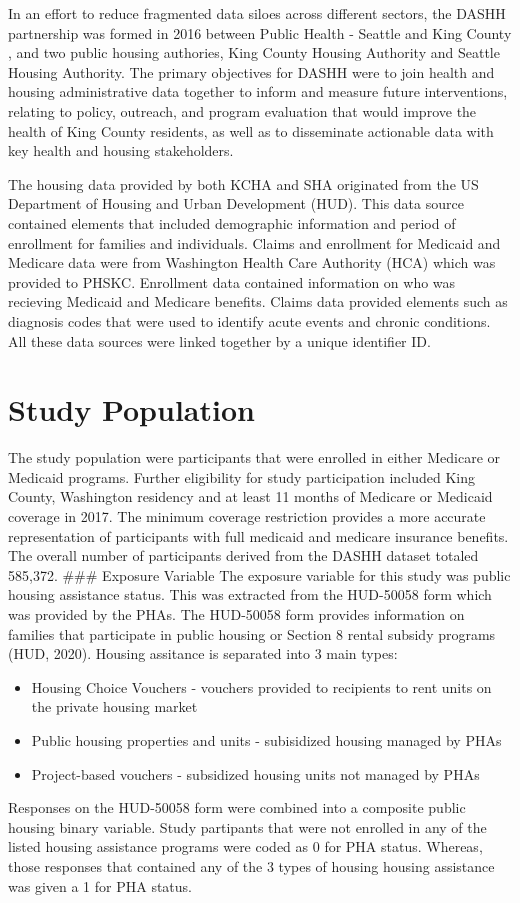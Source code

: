 \documentclass [11pt, proquest] {uwthesis}[2015/03/03]
\providecommand{\tightlist}{%
  \setlength{\itemsep}{0pt}\setlength{\parskip}{0pt}}
\begin{document}
In an effort to reduce fragmented data siloes across different sectors,
the DASHH partnership was formed in 2016 between Public Health - Seattle
and King County , and two public housing authories, King County Housing
Authority and Seattle Housing Authority. The primary objectives for
DASHH were to join health and housing administrative data together to
inform and measure future interventions, relating to policy, outreach,
and program evaluation that would improve the health of King County
residents, as well as to disseminate actionable data with key health and
housing stakeholders.

The housing data provided by both KCHA and SHA originated from the US
Department of Housing and Urban Development (HUD). This data source
contained elements that included demographic information and period of
enrollment for families and individuals. Claims and enrollment for
Medicaid and Medicare data were from Washington Health Care Authority
(HCA) which was provided to PHSKC. Enrollment data contained information
on who was recieving Medicaid and Medicare benefits. Claims data
provided elements such as diagnosis codes that were used to identify
acute events and chronic conditions. All these data sources were linked
together by a unique identifier ID.

\section{Study Population}\label{study-population}

The study population were participants that were enrolled in either
Medicare or Medicaid programs. Further eligibility for study
participation included King County, Washington residency and at least 11
months of Medicare or Medicaid coverage in 2017. The minimum coverage
restriction provides a more accurate representation of participants with
full medicaid and medicare insurance benefits. The overall number of
participants derived from the DASHH dataset totaled 585,372. \#\#\#
Exposure Variable The exposure variable for this study was public
housing assistance status. This was extracted from the HUD-50058 form
which was provided by the PHAs. The HUD-50058 form provides information
on families that participate in public housing or Section 8 rental
subsidy programs (HUD, 2020). Housing assitance is separated into 3 main
types:
\begin{itemize}
\tightlist
\item
  Housing Choice Vouchers - vouchers provided to recipients to rent
  units on the private housing market
\item
  Public housing properties and units - subisidized housing managed by
  PHAs
\item
  Project-based vouchers - subsidized housing units not managed by PHAs
\end{itemize}
Responses on the HUD-50058 form were combined into a composite public
housing binary variable. Study partipants that were not enrolled in any
of the listed housing assistance programs were coded as 0 for PHA
status. Whereas, those responses that contained any of the 3 types of
housing housing assistance was given a 1 for PHA status.
\end{document}
